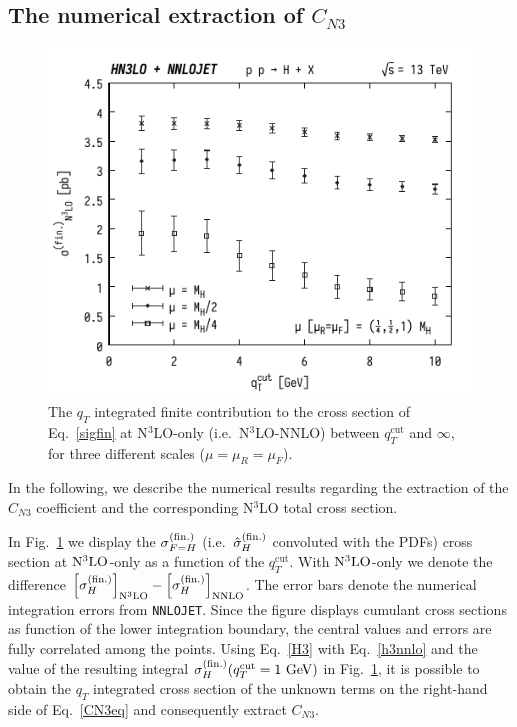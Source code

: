 \documentclass[12pt]{article}
\DeclareRobustCommand{\qt}{q_T}
\DeclareRobustCommand{\qtcut}{\ensuremath{q_T^\mathrm{cut}}}
\begin{document}
\subsection{The numerical extraction of $C_{N3}$}
\label{sec:numCN3}
\begin{figure}[t]
\centering
\includegraphics[width=.6\linewidth]{./new_figures/finN3LO}
\caption{\label{fig:finiten3lo}{The $\qt$ integrated finite contribution to the cross section of Eq.~\eqref{sigfin} at N$^{3}$LO-only (i.e.\ N$^{3}$LO-NNLO) between $\qtcut$ and $\infty$, for three different scales ($\mu=\mu_{R}=\mu_{F}$).}}
\end{figure}
In the following, we describe the numerical results regarding the extraction of the $C_{N3}$ coefficient and the corresponding N$^3$LO total cross section. 

In Fig.~\ref{fig:finiten3lo} we display the $\sigma_{F=H}^{(\rm fin.)}$ (i.e.\ ${\hat \sigma}_{H}^{(\rm fin.)}$ convoluted with the PDFs) cross section at $\rm N^3LO$-only as a function of the $\qtcut$. With $\rm N^3LO$-only we denote  the difference $\Bigl[ \sigma_{H}^{(\rm fin.)}\Bigr]_{\rm N^{3}LO} - \Bigl[ \sigma_{H}^{(\rm fin.)}\Bigr]_{\rm NNLO}$. 
The error bars denote the numerical integration errors from  \texttt{NNLOJET}. Since the figure displays cumulant cross sections as function of the lower integration boundary, the central values and errors are fully correlated among the points.
Using Eq.~\eqref{H3} with Eq.~\eqref{h3nnlo} and the value of the resulting integral $ \sigma_{H}^{(\rm fin.)}(\qtcut=1~{\rm GeV})$ in Fig.~\ref{fig:finiten3lo}, it is possible to obtain the $\qt$ integrated cross section of the unknown terms on the right-hand side of Eq.~\eqref{CN3eq} and consequently extract $C_{N3}$. 
\end{document}
